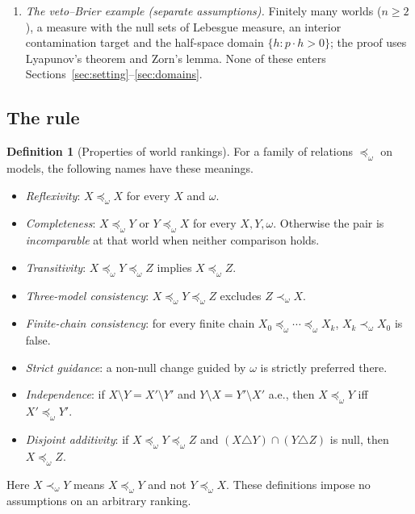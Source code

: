 \documentclass[11pt]{article}
\theoremstyle{plain}
\theoremstyle{definition}
\newtheorem{definition}[theorem]{Definition}
\theoremstyle{remark}
\begin{document}
\begin{enumerate}[label=(\Alph*)]
  finite-chain consistency (and so no reversal of a three-model chain), disjoint additivity and
  the absence of ties between distinct models (Proposition~\ref{prop:structure}); protection of
  every coherent model (Proposition~\ref{prop:protect}); uniform domination of every incoherent
  model by an undominated coherent one (Theorem~\ref{thm:main}(b)); and coverage of every credal
  set (Theorem~\ref{thm:main}(e)). Completeness and transitivity fail in general
  (Example~\ref{ex:intransitive}). Disjoint additivity and the absence of ties are not
  requirements on every covering ranking: the veto--Brier rankings of Section~\ref{sec:vb} tie
  distinct models.
  \item \emph{The veto--Brier example (separate assumptions).} Finitely many worlds ($n\ge2$), a
  measure with the null sets of Lebesgue measure, an interior contamination target and the
  half-space domain $\{h:p\cdot h>0\}$; the proof uses Lyapunov's theorem and Zorn's lemma. None
  of these enters Sections~\ref{sec:setting}--\ref{sec:domains}.
\end{enumerate}

\subsection{The rule}

\begin{definition}[Properties of world rankings]\label{def:ranking-properties}
For a family of relations $\preceq_\omega$ on models, the following names have these meanings.
\begin{itemize}
\item \emph{Reflexivity}: $X\preceq_\omega X$ for every $X$ and $\omega$.
\item \emph{Completeness}: $X\preceq_\omega Y$ or $Y\preceq_\omega X$ for every $X,Y,\omega$.
Otherwise the pair is \emph{incomparable} at that world when neither comparison holds.
\item \emph{Transitivity}: $X\preceq_\omega Y\preceq_\omega Z$ implies $X\preceq_\omega Z$.
\item \emph{Three-model consistency}: $X\preceq_\omega Y\preceq_\omega Z$ excludes
$Z\prec_\omega X$.
\item \emph{Finite-chain consistency}: for every finite chain
$X_0\preceq_\omega\cdots\preceq_\omega X_k$, $X_k\prec_\omega X_0$ is false.
\item \emph{Strict guidance}: a non-null change guided by $\omega$ is strictly preferred there.
\item \emph{Independence}: if $X\setminus Y=X'\setminus Y'$ and
$Y\setminus X=Y'\setminus X'$ a.e., then $X\preceq_\omega Y$ iff $X'\preceq_\omega Y'$.
\item \emph{Disjoint additivity}: if $X\preceq_\omega Y\preceq_\omega Z$ and
$(X\triangle Y)\cap(Y\triangle Z)$ is null, then $X\preceq_\omega Z$.
\end{itemize}
Here $X\prec_\omega Y$ means $X\preceq_\omega Y$ and not $Y\preceq_\omega X$.
These definitions impose no assumptions on an arbitrary ranking.
\end{definition}
\end{document}
